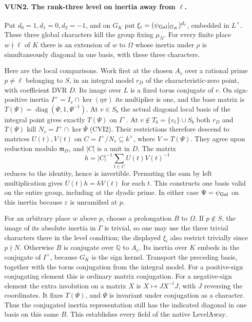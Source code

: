 \paragraph{VUN2. The rank-three level on inertia away from $\ell$.}
\label{claim:VUN2}
Put $d_0=1,d_1=0,d_2=-1$, and on $G_K$ put
$\xi_i=(\psi_{\rm Gal}|_{G_K})^{d_i}$, embedded in $L^\times$.
These three global characters kill the group fixing $\mu_N$.
For every finite place $w\nmid\ell$ of $K$ there is an extension
of $w$ to $\Omega$ whose inertia under $\rho$ is simultaneously
diagonal in one basis, with these three characters.

Here are the local comparisons. Work first at the chosen $A_v$ over
a rational prime $p\ne\ell$ belonging to $S$, in an integral
model $r_D$ of the characteristic-zero point, with coefficient
DVR $D$. Its image over $L$ is a fixed torus conjugate of $r$.
On sign-positive inertia $I^+=I_v\cap\ker(\eta\pi)$ its
multiplier is one, and the base matrix is
$T(\Psi)=\operatorname{diag}(\Psi,1,\Psi^{-1})$.
At $v\in S_b$ the actual diagonal local basis of the integral
point gives exactly $T(\Psi)$ on $I^+$. At
$v\notin T_b=\{v_\ell\}\cup S_b$ both $r_D$ and $T(\Psi)$
kill $N_v=I^+\cap\ker\bar\Psi$ (CVI2). Their restrictions
therefore descend to matrices $U(t),V(t)$ on
$C=I^+/N_v\subseteq k^\times$, where $V=T(\Psi)$.
They agree upon reduction modulo $\mathfrak m_D$, and $|C|$ is
a unit in $D$. The matrix
\[
                h=|C|^{-1}\sum_{t\in C}U(t)V(t)^{-1}
\]
reduces to the identity, hence is invertible. Permuting the sum by
left multiplication gives $U(t)h=hV(t)$ for each $t$. This
constructs one basis valid on the entire group, including at the
dyadic prime. In either case $\Psi=\psi_{\rm Gal}$ on this
inertia because $\varepsilon$ is unramified at $p$.

For an arbitrary place $w$ above $p$, choose a prolongation $B$
to $\Omega$. If $p\notin S$, the image of its absolute inertia
in $\Gamma$ is trivial, so one may use the three trivial
characters there in the level condition; the displayed $\xi_i$
also restrict trivially since $p\nmid N$. Otherwise $B$ is
conjugate over $\mathbb Q$ to $A_v$. Its inertia over $K$
embeds in the conjugate of $I^+$, because $G_K$ is the sign
kernel. Transport the preceding basis, together with the torus
conjugation from the integral model. For a positive-sign
conjugating element this is ordinary matrix conjugation. For a
negative-sign element the extra involution on a matrix $X$ is
$X\mapsto JX^{-t}J$, with $J$ reversing the coordinates. It
fixes $T(\Psi)$, and $\Psi$ is invariant under conjugation as a
character. Thus the conjugated inertia representation still has
the indicated diagonal in one basis on this same $B$. This
establishes every field of the native $\mathrm{LevelAway}$.


